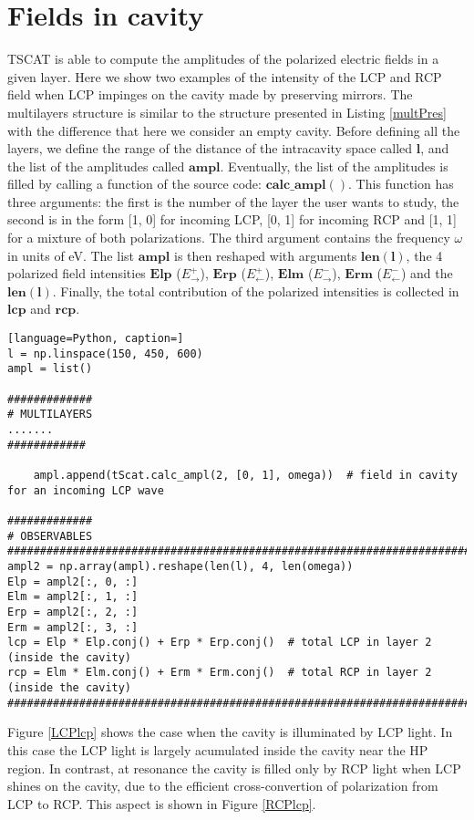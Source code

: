 \documentclass[showpacs,aps,prl,onecolumn,superscriptaddress]{revtex4-1}
\begin{document}
\section{Fields in cavity}
TSCAT is able to compute the amplitudes of the polarized electric fields in a given layer. Here we show two examples of the intensity of the LCP and RCP field when LCP impinges on the cavity made by preserving mirrors. The multilayers structure is similar to the structure presented in Listing \ref{multPres} with the difference that here we consider an empty cavity. Before defining all the layers, we define the range of the distance of the intracavity space called $\mathbf{l}$, and the list of the amplitudes called $\mathbf{ampl}$. Eventually, the list of the amplitudes is filled by calling a function of the source code: $\mathbf{calc\_ampl()}$. This function has three arguments: the first is the number of the layer the user wants to study, the second is in the form [1, 0] for incoming LCP, [0, 1] for incoming RCP and [1, 1] for a mixture of both polarizations. The third argument contains the frequency $\omega$ in units of eV. The list $\mathbf{ampl}$ is then reshaped with arguments $\mathbf{len(l)}$, the 4 polarized field intensities $\mathbf{Elp}$ ($E^{+}_{\rightarrow}$), $\mathbf{Erp}$ ($E^{+}_{\leftarrow}$), $\mathbf{Elm}$ ($E^{-}_{\rightarrow}$), $\mathbf{Erm}$ ($E^{-}_{\leftarrow}$) and the $\mathbf{len(l)}$. Finally, the total contribution of the polarized intensities is collected in $\mathbf{lcp}$ and $\mathbf{rcp}$.
\begin{lstlisting}[language=Python, caption=]
l = np.linspace(150, 450, 600)
ampl = list()

#############
# MULTILAYERS
.......
############

    ampl.append(tScat.calc_ampl(2, [0, 1], omega))  # field in cavity for an incoming LCP wave

#############
# OBSERVABLES
#####################################################################################
ampl2 = np.array(ampl).reshape(len(l), 4, len(omega)) 
Elp = ampl2[:, 0, :]
Elm = ampl2[:, 1, :]
Erp = ampl2[:, 2, :]
Erm = ampl2[:, 3, :]
lcp = Elp * Elp.conj() + Erp * Erp.conj()  # total LCP in layer 2 (inside the cavity)
rcp = Elm * Elm.conj() + Erm * Erm.conj()  # total RCP in layer 2 (inside the cavity)
#####################################################################################
\end{lstlisting}
Figure \ref{LCPlcp} shows the case when the cavity is illuminated by LCP light. In this case the LCP light is largely acumulated inside the cavity near the HP region. In contrast, at resonance the cavity is filled only by RCP light when LCP shines on the cavity, due to the efficient cross-convertion of polarization from LCP to RCP. This aspect is shown in Figure \ref{RCPlcp}.
\end{document}
